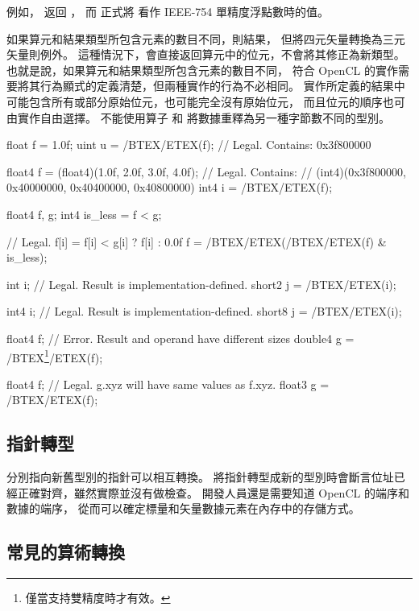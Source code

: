 例如，  返回 ，
而  正式將  看作 IEEE-754 單精度浮點數時的值。

如果算元和結果類型所包含元素的數目不同，則結果，
但將四元矢量轉換為三元矢量則例外。
這種情況下，會直接返回算元中的位元，不會將其修正為新類型。
也就是說，如果算元和結果類型所包含元素的數目不同，
符合 OpenCL 的實作需要將其行為顯式的定義清楚，但兩種實作的行為不必相同。
實作所定義的結果中可能包含所有或部分原始位元，也可能完全沒有原始位元，
而且位元的順序也可由實作自由選擇。
不能使用算子  和  將數據重釋為另一種字節數不同的型別。

\startexample
\startclc
float f = 1.0f;
uint u = /BTEX/ETEX(f);	// Legal. Contains:	0x3f800000

float4 f = (float4)(1.0f, 2.0f, 3.0f, 4.0f);
// Legal. Contains:
// (int4)(0x3f800000, 0x40000000, 0x40400000, 0x40800000)
int4 i = /BTEX/ETEX(f);

float4 f, g;
int4 is_less = f < g;

// Legal. f[i] = f[i] < g[i] ? f[i] : 0.0f
f = /BTEX/ETEX(/BTEX/ETEX(f) & is_less);

int i;
// Legal. Result is implementation-defined.
short2 j = /BTEX/ETEX(i);

int4 i;
// Legal. Result is implementation-defined.
short8 j = /BTEX/ETEX(i);

float4 f;
// Error. Result and operand have different sizes
double4 g = /BTEX\footnote{僅當支持雙精度時才有效。}/ETEX(f);

float4 f;
// Legal. g.xyz will have same values as f.xyz.
float3 g = /BTEX/ETEX(f);
\stopclc
\stopexample

\subsection{指針轉型}

分別指向新舊型別的指針可以相互轉換。
將指針轉型成新的型別時會斷言位址已經正確對齊，雖然實際並沒有做檢查。
開發人員還是需要知道 OpenCL 的端序和數據的端序，
從而可以確定標量和矢量數據元素在內存中的存儲方式。

\subsection[sec:usualArithConv]{常見的算術轉換}

